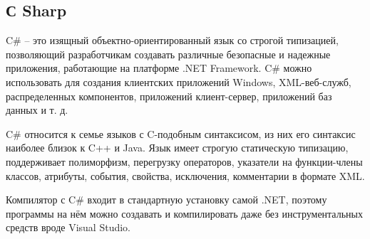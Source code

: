 \subsection{С Sharp}


C\# – это изящный объектно-ориентированный язык со строгой типизацией, позволяющий разработчикам создавать различные безопасные и надежные приложения, работающие на платформе .NET Framework. C\# можно использовать для создания клиентских приложений Windows, XML-веб-служб, распределенных компонентов, приложений клиент-сервер, приложений баз данных и т. д.


C\# относится к семье языков с C-подобным синтаксисом, из них его синтаксис наиболее близок к C++ и Java. Язык имеет строгую статическую типизацию, поддерживает полиморфизм, перегрузку операторов, указатели на функции-члены классов, атрибуты, события, свойства, исключения, комментарии в формате XML.

Компилятор с C\# входит в стандартную установку самой .NET, поэтому программы на нём можно создавать и компилировать даже без инструментальных средств вроде Visual Studio.